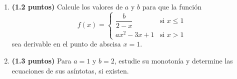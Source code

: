 
\begin{enumerate}[label=\alph*)]
\item \textbf{(1.2 puntos)} Calcule los valores de $a$ y $b$ para que la función
\[
f(x)=\begin{cases}
\dfrac{b}{2-x} & \text{si }x\leq1\\[4pt]
ax^2-3x+1 & \text{si }x>1
\end{cases}
\]
sea derivable en el punto de abscisa $x=1$.
\item \textbf{(1.3 puntos)} Para $a=1$ y $b=2$, estudie su monotonía y determine las ecuaciones de sus asíntotas, si existen.
\end{enumerate}
